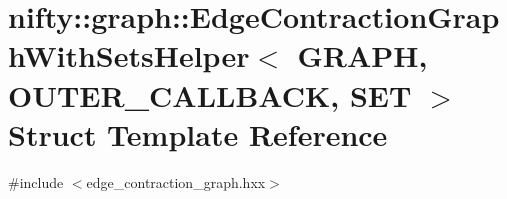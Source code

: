 \hypertarget{structnifty_1_1graph_1_1EdgeContractionGraphWithSetsHelper}{}\section{nifty\+:\+:graph\+:\+:Edge\+Contraction\+Graph\+With\+Sets\+Helper$<$ G\+R\+A\+P\+H, O\+U\+T\+E\+R\+\_\+\+C\+A\+L\+L\+B\+A\+C\+K, S\+E\+T $>$ Struct Template Reference}
\label{structnifty_1_1graph_1_1EdgeContractionGraphWithSetsHelper}


{\ttfamily \#include $<$edge\+\_\+contraction\+\_\+graph.\+hxx$>$}

